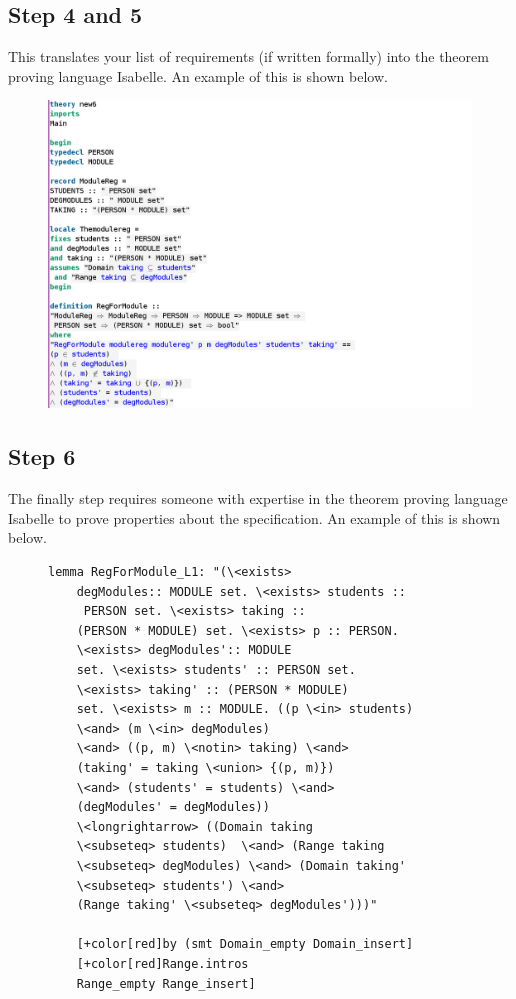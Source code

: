 \subsection{Step 4 and 5}

This translates your list of requirements (if written formally)  into the
theorem proving language Isabelle. An example of this is shown below.


\begin{figure}
    \includegraphics[width=\linewidth]{examples/modulereg/6imagea.png}
\end{figure}

\subsection{Step 6}

The finally step requires someone with expertise in the theorem proving language
Isabelle to prove properties about the specification.
An example of this is shown below.

\begin{figure}[H]
    \centering
    \begin{scriptsize}   
    \begin{BVerbatim}[commandchars=+\[\]] 
    lemma RegForModule_L1: "(\<exists>
    degModules:: MODULE set. \<exists> students ::
     PERSON set. \<exists> taking ::
    (PERSON * MODULE) set. \<exists> p :: PERSON. 
    \<exists> degModules':: MODULE
    set. \<exists> students' :: PERSON set. 
    \<exists> taking' :: (PERSON * MODULE)
    set. \<exists> m :: MODULE. ((p \<in> students) 
    \<and> (m \<in> degModules)
    \<and> ((p, m) \<notin> taking) \<and> 
    (taking' = taking \<union> {(p, m)})
    \<and> (students' = students) \<and> 
    (degModules' = degModules))
    \<longrightarrow> ((Domain taking 
    \<subseteq> students)  \<and> (Range taking
    \<subseteq> degModules) \<and> (Domain taking' 
    \<subseteq> students') \<and>
    (Range taking' \<subseteq> degModules')))"
    
    [+color[red]by (smt Domain_empty Domain_insert] 
    [+color[red]Range.intros
    Range_empty Range_insert]
    \end{BVerbatim}
    \end{scriptsize}
    \end{figure}